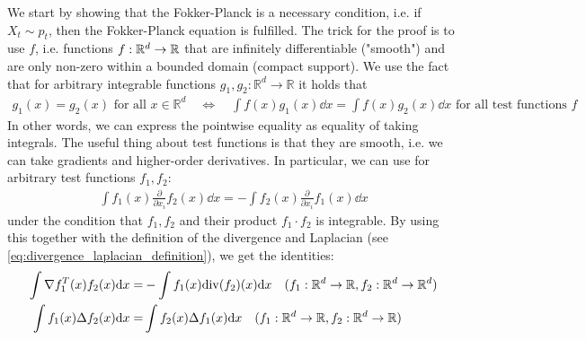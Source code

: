 We start by showing that the Fokker-Planck is a necessary condition, i.e. if $X_t\sim p_t$, then the Fokker-Planck equation is fulfilled. The trick for the proof is to use  $f$, i.e. functions $f:\mathbb{R}^d\to\mathbb{R}$ that are infinitely differentiable ("smooth") and are only non-zero within a bounded domain (compact support). We use the fact that for arbitrary integrable functions $g_1,g_2:\mathbb{R}^d\to\mathbb{R}$ it holds that
\begin{align}
\label{eq:test_function_usecase}
g_1(x) = g_2(x)\text{ for all }x\in\mathbb{R}^d\quad \Leftrightarrow \quad \int f(x) g_1(x)\dd x = \int f(x) g_2(x)\dd x\text{ for all test functions }f
\end{align}
In other words, we can express the pointwise equality as equality of taking integrals. The useful thing about test functions is that they are smooth, i.e. we can take gradients and higher-order derivatives. In particular, we can use  for arbitrary test functions $f_1,f_2$:
\begin{align}
    \int f_1(x) \frac{\partial}{\partial x_i}f_2(x)\dd x = - \int f_2(x) \frac{\partial}{\partial x_i}f_1(x)\dd x
\end{align}
under the condition that $f_1,f_2$ and their product $f_1\cdot f_2$ is integrable. By using this together with the definition of the divergence and Laplacian (see \cref{eq:divergence_laplacian_definition}), we get the identities:
\begin{align}
\label{eq:integration_by_parts_divergence}
    \int \nabla f_1^T(x) f_2(x)\mathrm{d} x =& -\int f_1(x)\mathrm{div}(f_2)(x)\mathrm{d} x \quad (f_1:\mathbb{R}^d\to\mathbb{R},f_2:\mathbb{R}^d\to\mathbb{R}^d)\\
\label{eq:integration_by_parts_laplacian}
    \int f_1(x) \Delta f_2(x) \mathrm{d} x =& \int f_2(x) \Delta f_1(x) \mathrm{d} x\quad (f_1:\mathbb{R}^d\to\mathbb{R},f_2:\mathbb{R}^d\to\mathbb{R})
\end{align}



